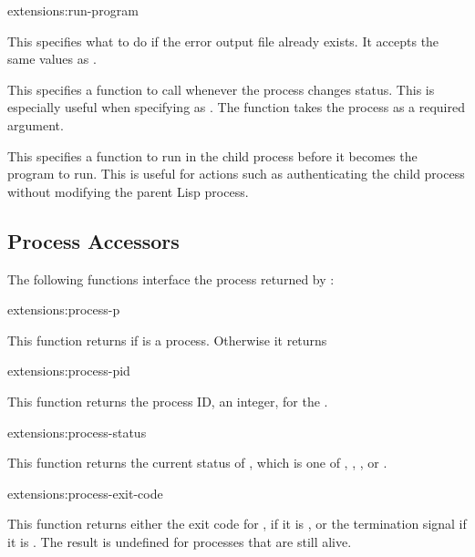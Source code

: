 \begin{defun}{extensions:}{run-program}
\begin{Lentry}
  \item[\kwd{if-error-exists}] This specifies what to do if the error
    output file already exists.  It accepts the same values as
    .
    
  \item[\kwd{status-hook}] This specifies a function to call whenever
    the process changes status.  This is especially useful when
    specifying  as \nil.  The function takes the process as
    a required argument.
    
  \item[\kwd{before-execve}] This specifies a function to run in the
    child process before it becomes the program to run.  This is
    useful for actions such as authenticating the child process
    without modifying the parent Lisp process.
  \end{Lentry}
\end{defun}


\subsection{Process Accessors}

The following functions interface the process returned by :

\begin{defun}{extensions:}{process-p}{}
  
  This function returns \true{} if  is a process.
  Otherwise it returns \nil{}
\end{defun}

\begin{defun}{extensions:}{process-pid}{}
  
  This function returns the process ID, an integer, for the
  .
\end{defun}

\begin{defun}{extensions:}{process-status}{}
  
  This function returns the current status of , which is
  one of , , , or
  .
\end{defun}

\begin{defun}{extensions:}{process-exit-code}{}
  
  This function returns either the exit code for , if it
  is , or the termination signal  if it is
  .  The result is undefined for processes that are
  still alive.
\end{defun}

